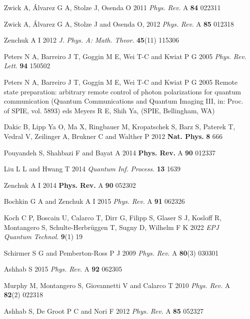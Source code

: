 \documentclass[pra,preprint,showpacs]{revtex4-1}
\begin{document}
{{\begin{thebibliography}{99}
Zwick A, \'Alvarez G A, Stolze J, Osenda O
2011 {\it Phys. Rev.} A {\bf 84}  022311

Zwick A,  \'Alvarez G A,
 Stolze J and Osenda O,
2012 {\it Phys. Rev.} A  {\bf 85}  012318

Zenchuk A I
2012 {\it J. Phys. A: Math. Theor.}  {\bf 45}(11)
115306


Peters N A,  Barreiro J T,  Goggin M E,  Wei T-C and Kwiat P G
2005 {\it Phys. Rev. Lett.} {\bf 94}  150502

Peters N A, Barreiro J T, Goggin M E,  Wei T-C and Kwiat P G
2005 Remote state preparation: arbitrary remote control of photon polarizations for quantum communication
 (Quantum Communications and Quantum Imaging III, in: Proc. of SPIE, vol. 5893) eds Meyers R E,  Shih Ya, (SPIE, Bellingham, WA)

 Dakic  B, Lipp Ya O, Ma X, Ringbauer M, Kropatschek S,  Barz S,  Paterek T, Vedral V,  Zeilinger A, Brukner C and Walther P
2012 {\bf Nat. Phys.} {\bf 8} 666


 Pouyandeh S, Shahbazi F and Bayat A
2014 {\bf Phys. Rev.} A {\bf 90}
 012337

Liu L L and  Hwang T
2014 {\it Quantum Inf. Process.} {\bf 13} 1639

 Zenchuk A I
2014 {\bf Phys. Rev.} A {\bf 90}  052302

Bochkin G A and  Zenchuk A I
2015 {\it Phys. Rev.} A {\bf 91}  062326

Koch C P, Boscain U, Calarco T, Dirr G, Filipp S, Glaser S J, Kosloff R, Montangero S, Schulte-Herbrüggen T, Sugny D, Wilhelm F K
 2022 {\it EPJ Quantum Technol.} {\bf 9}(1) 19



 Schirmer S G and Pemberton-Ross P J
 2009 {\it Phys. Rev.} A {\bf 80}(3) 030301

 {Ashhab S 2015
{\it Phys. Rev.} A {\bf 92} 062305}

 Murphy M, Montangero S, Giovannetti V and Calarco T
2010 {\it Phys. Rev.} A  {\bf 82}(2) 022318

 {Ashhab S, De Groot P C and Nori F 2012
{\it Phys. Rev.} A {\bf 85} 052327}


\end{thebibliography}}}
\end{document}
